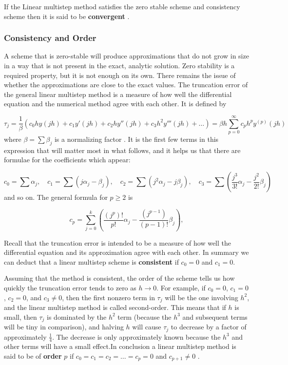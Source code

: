 \documentclass[a4paper, twoside]{report} %
\begin{document}
	If the Linear multistep method satisfies the zero stable scheme and consistency scheme then it is said to be \textbf{convergent} \cite{2022JFatokunEtAl}.

	\subsubsection*{Consistency and Order}
	A scheme that is zero-stable will produce approximations that do not grow in size in a way that is not present in the exact, analytic solution. Zero stability is a required property, but it is not enough on its own. There remains the issue of whether the approximations are close to the exact values. The truncation error of the general linear multistep method is a measure of how well the differential equation and the numerical method agree with each other. It is defined by


	\begin{equation}
		\tau_j = \frac{1}{\beta} \left( c_0 h y(jh) + c_1 y'(jh) + c_2 h y''(jh) + c_3 h^2 y'''(jh) + \ldots \right) = \beta h \sum_{p=0}^{\infty} c_p h^p y^{(p)}(jh)
	\end{equation}
	where $\beta = \sum \beta_j$ is a normalizing factor \cite{2022JFatokunEtAl}.
	It is the first few terms in this expression that will matter most in what follows, and it helps us that there are formulae for the coefficients which appear:


	\begin{equation}
		c_0 = \sum \alpha_j, \quad c_1 = \sum (j\alpha_j - \beta_j), \quad c_2 = \sum \left( j^2 \alpha_j - j \beta_j \right), \quad c_3 = \sum \left( \frac{j^3}{3!} \alpha_j - \frac{j^2}{2!} \beta_j \right)
	\end{equation}
	and so on. The general formula for $p \geq 2$ is

	\begin{equation}
		c_p = \sum_{j=0}^{k} \left( \frac{(j^p)!}{p!} \alpha_j - \frac{(j^{p-1})}{(p-1)!} \beta_j \right),
	\end{equation}

	Recall that the truncation error is intended to be a measure of how well the differential equation and its approximation agree with each other\cite{HELM2008NumericalIVP}. In summary we can deduct that a linear multistep scheme is \textbf{consistent} if $c_0 = 0$ and $c_1 = 0$.


	Assuming that the method is consistent, the order of the scheme tells us how quickly the truncation error tends to zero as $h \rightarrow 0$. For example, if $c_0 = 0$, $c_1 = 0$, $c_2 = 0$, and $c_3 \neq 0$, then the first nonzero term in $\tau_j$ will be the one involving $h^2$, and the linear multistep method is called second-order. This means that if $h$ is small, then $\tau_j$ is dominated by the $h^2$ term (because the $h^3$ and subsequent terms will be tiny in comparison), and halving $h$ will cause $\tau_j$ to decrease by a factor of approximately $\frac{1}{4}$. The decrease is only approximately known because the $h^3$ and other terms will have a small effect.In conclusion a linear multistep method is said to be of \textbf{order} $p$ if $c_0 = c_1 = c_2 = \ldots = c_p = 0$ and $c_{p+1} \neq 0$ \cite{HELM2008NumericalIVP}.
\end{document}
